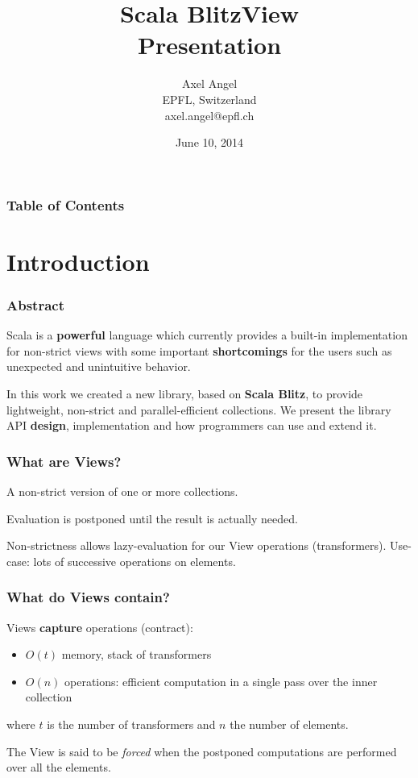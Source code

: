 \documentclass[12pt]{beamer}
\title{Scala BlitzView \\Presentation}
\author{Axel Angel \\EPFL, Switzerland \\axel.angel@epfl.ch}
\date{June 10, 2014}
\begin{document}
\begin{frame}
    \maketitle
\end{frame}

\begin{frame}
    \frametitle{Table of Contents}
    \tableofcontents
\end{frame}

\section{Introduction}
\begin{frame}
    \frametitle{Abstract}
    Scala is a {\bf powerful} language which currently provides a built-in implementation for non-strict views with some important {\bf shortcomings} for the users such as unexpected and unintuitive behavior.

    In this work we created a new library, based on {\bf Scala Blitz}, to provide lightweight, non-strict and parallel-efficient collections.
    We present the library API {\bf design}, implementation and how programmers can use and extend it.
\end{frame}

\begin{frame}
    \frametitle{What are Views?}
    \begin{definition}[View]
        A non-strict version of one or more collections.
    \end{definition}

    \begin{definition}
         Evaluation is postponed until the result is actually needed.
    \end{definition}
    Non-strictness allows lazy-evaluation for our View operations (transformers).
    Use-case: lots of successive operations on elements.
\end{frame}

\begin{frame}
    \frametitle{What do Views contain?}
    Views {\bf capture} operations (contract):
    \begin{itemize}
        \item $O(t)$ memory, stack of transformers
        \item $O(n)$ operations: efficient computation in a single pass over the inner collection
    \end{itemize}
    where $t$ is the number of transformers and $n$ the number of elements.

    \begin{definition}
        The View is said to be {\it forced} when the postponed computations are performed over all the elements.
    \end{definition}
\end{frame}
\end{document}
